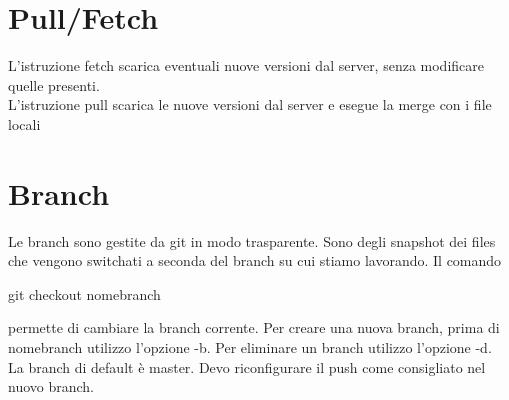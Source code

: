 \section{Pull/Fetch}
L'istruzione fetch scarica eventuali nuove versioni dal server, senza modificare quelle presenti.\\
L'istruzione pull scarica le nuove versioni dal server e esegue la merge con i file locali

\section{Branch}
Le branch sono gestite da git in modo trasparente. Sono degli snapshot dei files che vengono switchati a seconda del branch su cui stiamo lavorando. Il comando

\begin{tcolorbox}
git checkout nomebranch
\end{tcolorbox}

permette di cambiare la branch corrente. Per creare una nuova branch, prima di nomebranch utilizzo l'opzione -b. Per eliminare un branch utilizzo l'opzione -d.\\
La branch di default è master.
Devo riconfigurare il push come consigliato nel nuovo branch.